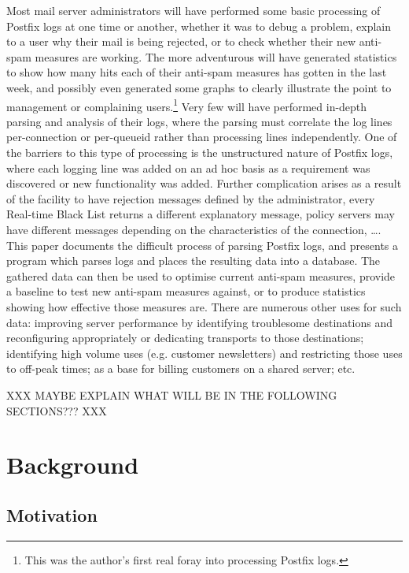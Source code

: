 \documentclass[a4paper,12pt,draft]{article}
\begin{document}
Most mail server administrators will have performed some basic processing
of Postfix logs at one time or another, whether it was to debug a problem,
explain to a user why their mail is being rejected, or to check whether
their new anti-spam measures are working.  The more adventurous will have
generated statistics to show how many hits each of their anti-spam measures
has gotten in the last week, and possibly even generated some graphs to
clearly illustrate the point to management or complaining
users.\footnote{This was the author's first real foray into processing
Postfix logs.}  Very few will have performed in-depth parsing and analysis
of their logs, where the parsing must correlate the log lines
per-connection or per-queueid rather than processing lines independently.
One of the barriers to this type of processing is the unstructured nature
of Postfix logs, where each logging line was added on an ad hoc basis as a
requirement was discovered or new functionality was added.  Further
complication arises as a result of the facility to have rejection messages
defined by the administrator, every Real-time Black List returns a
different explanatory message, policy servers may have different messages
depending on the characteristics of the connection, \ldots.  This paper
documents the difficult process of parsing Postfix logs, and presents a
program which parses logs and places the resulting data into a database.
The gathered data can then be used to optimise current anti-spam measures,
provide a baseline to test new anti-spam measures against, or to produce
statistics showing how effective those measures are.  There are numerous
other uses for such data: improving server performance by identifying
troublesome destinations and reconfiguring appropriately or dedicating
transports to those destinations; identifying high volume uses (e.g.
customer newsletters) and restricting those uses to off-peak times; as a
base for billing customers on a shared server; etc.



XXX MAYBE EXPLAIN WHAT WILL BE IN THE FOLLOWING SECTIONS??? XXX

\section{Background}

\subsection{Motivation}
\end{document}
